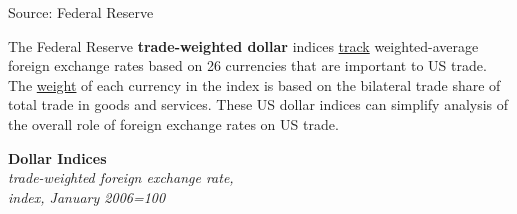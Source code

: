 \documentclass{report}
\makeatletter
\newcommand{\tbllink}[1]{\href{https://raw.githubusercontent.com/bdecon/US-chartbook/master/chartbook/data/#1}{\faTable}}
\newcommand*\short[1]{\expandafter\@gobbletwo\number\numexpr#1\relax}
\newcommand{\absnode}[3]{\node[below right, align=left] at (axis cs: #1,#2) {#3};}
\newcommand{\dateaxisticks}{
		date coordinates in=x, axis line style={draw=none},
		xmax={2024-01-31},
		max space between ticks=40,	    
		xtick={{1990-01-01}, {1992-01-01}, {1994-01-01}, 
			{1996-01-01}, {1998-01-01}, {2000-01-01}, 
			{2002-01-01}, {2004-01-01}, {2006-01-01},
			{2008-01-01}, {2010-01-01}, {2012-01-01}, {2014-01-01},
		    {2016-01-01}, {2018-01-01}, {2020-01-01}, {2022-01-01}, 
		    {2024-01-01}, {2026-01-01}},
		minor xtick={{1989-01-01}, {1991-01-01}, {1993-01-01},
			{1995-01-01}, {1997-01-01}, {1999-01-01}, 
			{2001-01-01}, {2003-01-01}, {2005-01-01}, {2007-01-01},
		    {2009-01-01}, {2011-01-01}, {2013-01-01}, {2015-01-01},
		    {2017-01-01}, {2019-01-01}, {2021-01-01}, {2023-01-01}, 
		    {2025-01-01}, {2027-01-01}},
		enlarge y limits={0.06}, enlarge x limits={0.01},
		xticklabel style={align=center, yshift=-2pt}, tick label style={inner sep=0pt},
		}
\newcommand{\bbar}[2]{extra #1 ticks = {{#2}}, extra #1 tick labels = ,
		extra #1 tick style = {grid=major, grid style={thick, black!25}},}
\newcommand{\stdline}[4]{\addplot[very thick, no markers, color=#1] 
		table [x=#2, y=#3, col sep=comma] {#4};	}
\newcommand{\rbars}{
		\fill[color=black!10] (axis cs:{1990-07-01},\pgfkeysvalueof{/pgfplots/ymin})
			rectangle (axis cs:{1991-03-01}, \pgfkeysvalueof{/pgfplots/ymax});
		\fill[color=black!10] (axis cs:{2007-12-01},\pgfkeysvalueof{/pgfplots/ymin})
			rectangle (axis cs:{2009-07-01}, \pgfkeysvalueof{/pgfplots/ymax});
		\fill[color=black!10] (axis cs:{2001-03-01},\pgfkeysvalueof{/pgfplots/ymin})
			rectangle (axis cs:{2001-11-01}, \pgfkeysvalueof{/pgfplots/ymax});
		\fill[color=black!10] (axis cs:{2020-02-01},\pgfkeysvalueof{/pgfplots/ymin})
			rectangle (axis cs:{2020-05-01}, \pgfkeysvalueof{/pgfplots/ymax});}
\makeatother
\begin{document}
{\begin{minipage}{1.0\textwidth}
\hspace{3mm} 

\footnotesize{Source: Federal Reserve} \hfill \tbllink{fx1.csv}
\vspace{4mm} 

\small The Federal Reserve \textbf{trade-weighted dollar} indices \href{https://www.federalreserve.gov/releases/h10/summary/default.htm}{track} weighted-average foreign exchange rates based on 26 currencies that are important to US trade. The \href{https://www.federalreserve.gov/releases/h10/weights/default.htm}{weight} of each currency in the index is based on the bilateral trade share of total trade in goods and services. These US dollar indices can simplify analysis of the overall role of foreign exchange rates on US trade. 

\begin{minipage}{0.46\textwidth}
\normalsize \textbf{Dollar Indices}\\
\footnotesize{\textit{trade-weighted foreign exchange rate,}}\\
\footnotesize{\textit{index, January 2006=100}}
\vspace{2.55cm}


\end{minipage}
\end{minipage}}
\end{document}
